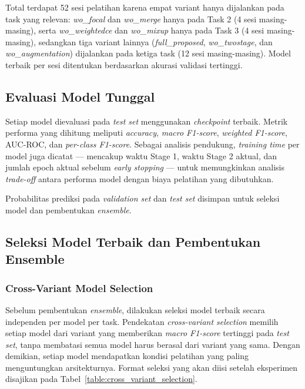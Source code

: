 Total terdapat 52 sesi pelatihan karena empat variant hanya
dijalankan pada task yang relevan: \textit{wo\_focal} dan
\textit{wo\_merge} hanya pada Task 2 (4 sesi masing-masing), serta
\textit{wo\_weightedce} dan \textit{wo\_mixup} hanya pada Task 3
(4 sesi masing-masing), sedangkan tiga variant lainnya
(\textit{full\_proposed}, \textit{wo\_twostage}, dan
\textit{wo\_augmentation}) dijalankan pada ketiga task (12 sesi
masing-masing). Model terbaik per sesi ditentukan berdasarkan akurasi
validasi tertinggi. \par

\subsection{Evaluasi Model Tunggal} \label{III.Langkah6}
Setiap model dievaluasi pada \textit{test set} menggunakan
\textit{checkpoint} terbaik. Metrik performa yang dihitung meliputi
\textit{accuracy}, \textit{macro F1-score}, \textit{weighted F1-score},
AUC-ROC, dan \textit{per-class F1-score}. Sebagai analisis pendukung,
\textit{training time} per model juga dicatat --- mencakup waktu Stage 1,
waktu Stage 2 aktual, dan jumlah epoch aktual sebelum \textit{early
stopping} --- untuk memungkinkan analisis \textit{trade-off} antara
performa model dengan biaya pelatihan yang dibutuhkan. \par

Probabilitas prediksi pada \textit{validation set} dan \textit{test set}
disimpan untuk seleksi model dan pembentukan \textit{ensemble}. \par

\subsection{Seleksi Model Terbaik dan Pembentukan Ensemble}
\label{III.Langkah7}

\subsubsection{Cross-Variant Model Selection}
Sebelum pembentukan \textit{ensemble}, dilakukan seleksi model terbaik
secara independen per model per task. Pendekatan
\textit{cross-variant selection} memilih setiap model dari variant yang
memberikan \textit{macro F1-score} tertinggi pada \textit{test set},
tanpa membatasi semua model harus berasal dari variant yang sama.
Dengan demikian, setiap model mendapatkan kondisi pelatihan yang paling
menguntungkan arsitekturnya. Format seleksi yang akan diisi setelah
eksperimen disajikan pada Tabel~\ref{table:cross_variant_selection}. \par

